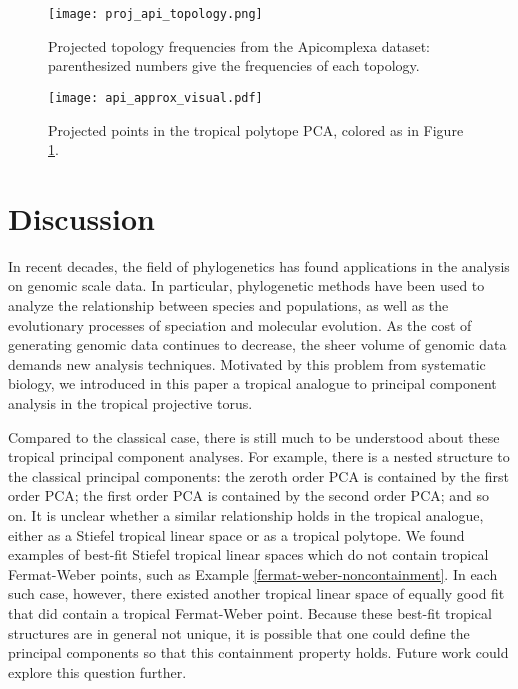 \documentclass[12pt]{extarticle}
\numberwithin{theorem}{section}
\begin{document}


\begin{figure}[!ht]
\texttt{[image: proj\_api\_topology.png]}
\caption{Projected topology frequencies from the Apicomplexa dataset: parenthesized numbers give the frequencies of each topology.}%
\label{api_topology}
\end{figure}
\begin{figure}[!ht]

  \texttt{[image: api\_approx\_visual.pdf]}
{%
\caption{Projected points in the tropical polytope PCA, colored as in Figure \ref{api_topology}.}%
\label{api_triangle}
}
\end{figure}



\section{Discussion}\label{discuss}

In recent decades, the field of phylogenetics has found
applications in the analysis on genomic scale data.  In particular, phylogenetic methods have been used to analyze the relationship between species and populations, as well as the evolutionary processes of 
speciation and molecular evolution.  As the cost of generating genomic data continues to decrease, the sheer volume of genomic data demands new analysis techniques. Motivated by this problem from systematic biology, we introduced in this paper a tropical analogue to principal component analysis in the tropical projective torus.

Compared to the classical case, there is still much to be understood about these tropical principal component analyses.  
For example, there is a nested structure to the classical principal components: the zeroth order PCA is contained by the
first order PCA; the first order PCA is
contained by the second order PCA; and so on.  It is unclear whether a similar relationship holds in the tropical analogue, either as a Stiefel tropical linear space or as a tropical polytope. We found examples of best-fit Stiefel tropical linear spaces which do not contain tropical Fermat-Weber points, such as Example \ref{fermat-weber-noncontainment}. In each such case, however, there existed another tropical linear space of equally good fit that did contain a tropical Fermat-Weber point. Because these best-fit tropical structures are in general not unique, it is possible that one could define the principal components so that this containment property holds. Future work could explore this question further.
\end{document}
